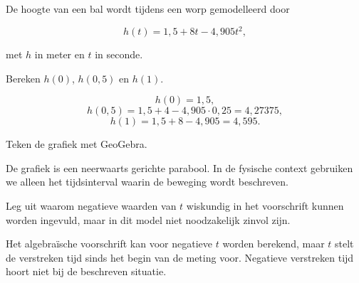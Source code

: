 \documentclass{ximera}
\begin{document}
\begin{oefening}{\oefU\ESS}

De hoogte van een bal wordt tijdens een worp gemodelleerd door

\[
h(t)=1{,}5+8t-4{,}905t^2,
\]

met \(h\) in meter en \(t\) in seconde.

\begin{question}
Bereken \(h(0)\), \(h(0{,}5)\) en \(h(1)\).

\begin{oplossing}
\[
h(0)=1{,}5,
\]
\[
h(0{,}5)=1{,}5+4-4{,}905\cdot0{,}25
=4{,}27375,
\]
\[
h(1)=1{,}5+8-4{,}905=4{,}595.
\]
\end{oplossing}
\end{question}

\begin{question}
Teken de grafiek met GeoGebra.

\begin{oplossing}
De grafiek is een neerwaarts gerichte parabool. In de fysische context
gebruiken we alleen het tijdsinterval waarin de beweging wordt beschreven.
\end{oplossing}
\end{question}

\begin{question}
Leg uit waarom negatieve waarden van \(t\) wiskundig in het voorschrift
kunnen worden ingevuld, maar in dit model niet noodzakelijk zinvol zijn.

\begin{oplossing}
Het algebraïsche voorschrift kan voor negatieve \(t\) worden berekend,
maar \(t\) stelt de verstreken tijd sinds het begin van de meting voor.
Negatieve verstreken tijd hoort niet bij de beschreven situatie.
\end{oplossing}
\end{question}

\end{oefening}

\end{document}
